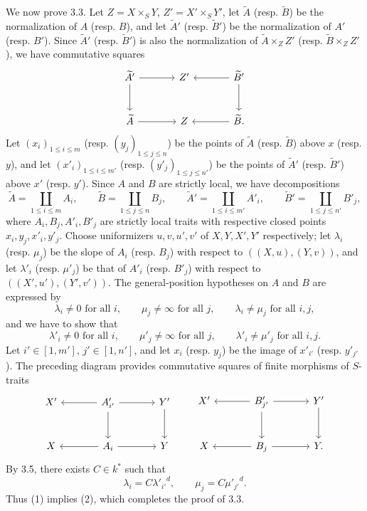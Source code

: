 \documentclass[11pt]{article}
\begin{document}
We now prove 3.3. Let $Z=X\times_SY$, $Z'=X'\times_SY'$, let $\widetilde A$ (resp. $\widetilde B$) be the normalization of $A$ (resp. $B$), and let $\widetilde A'$ (resp. $\widetilde B'$) be the normalization of $A'$ (resp. $B'$). Since $\widetilde A'$ (resp. $\widetilde B'$) is also the normalization of $\widetilde A\times_ZZ'$ (resp. $\widetilde B\times_ZZ'$), we have commutative squares
\[
\begin{tikzcd}[column sep=large,row sep=large]
\widetilde A' \arrow[r] \arrow[d] & Z' & \widetilde B' \arrow[l] \arrow[d]\\
\widetilde A \arrow[r] & Z & \widetilde B . \arrow[l]
\end{tikzcd}
\]
Let $(x_i)_{1\le i\le m}$ (resp. $(y_j)_{1\le j\le n}$) be the points of $\widetilde A$ (resp. $\widetilde B$) above $x$ (resp. $y$), and let $(x'_i)_{1\le i\le m'}$ (resp. $(y'_j)_{1\le j\le n'}$) be the points of $\widetilde A'$ (resp. $\widetilde B'$) above $x'$ (resp. $y'$). Since $A$ and $B$ are strictly local, we have decompositions
\[
\widetilde A=\coprod_{1\le i\le m}A_i,\qquad
\widetilde B=\coprod_{1\le j\le n}B_j,\qquad
\widetilde A'=\coprod_{1\le i\le m'}A'_i,\qquad
\widetilde B'=\coprod_{1\le j\le n'}B'_j,
\]
where $A_i,B_j,A'_i,B'_j$ are strictly local traits with respective closed points $x_i,y_j,x'_i,y'_j$. Choose uniformizers $u,v,u',v'$ of $X,Y,X',Y'$ respectively; let $\lambda_i$ (resp. $\mu_j$) be the slope of $A_i$ (resp. $B_j$) with respect to $((X,u),(Y,v))$, and let $\lambda'_i$ (resp. $\mu'_j$) be that of $A'_i$ (resp. $B'_j$) with respect to $((X',u'),(Y',v'))$. The general-position hypotheses on $A$ and $B$ are expressed by
\begin{equation}
\lambda_i\ne0\text{ for all }i,\qquad
\mu_j\ne\infty\text{ for all }j,\qquad
\lambda_i\ne\mu_j\text{ for all }i,j,
\tag{1}
\end{equation}
and we have to show that
\begin{equation}
\lambda'_i\ne0\text{ for all }i,\qquad
\mu'_j\ne\infty\text{ for all }j,\qquad
\lambda'_i\ne\mu'_j\text{ for all }i,j.
\tag{2}
\end{equation}
Let $i'\in[1,m']$, $j'\in[1,n']$, and let $x_i$ (resp. $y_j$) be the image of $x'_{i'}$ (resp. $y'_{j'}$). The preceding diagram provides commutative squares of finite morphisms of $S$-traits
\[
\begin{tikzcd}[column sep=large,row sep=large]
X' & A'_{i'} \arrow[l] \arrow[r] \arrow[d] & Y' \arrow[d]\\
X & A_i \arrow[l] \arrow[r] & Y
\end{tikzcd}
\qquad
\begin{tikzcd}[column sep=large,row sep=large]
X' & B'_{j'} \arrow[l] \arrow[r] \arrow[d] & Y' \arrow[d]\\
X & B_j \arrow[l] \arrow[r] & Y .
\end{tikzcd}
\]
By 3.5, there exists $C\in k^*$ such that
\[
\lambda_i=C{\lambda'_{i'}}^d,\qquad
\mu_j=C{\mu'_{j'}}^d.
\]
Thus (1) implies (2), which completes the proof of 3.3.
\end{document}

